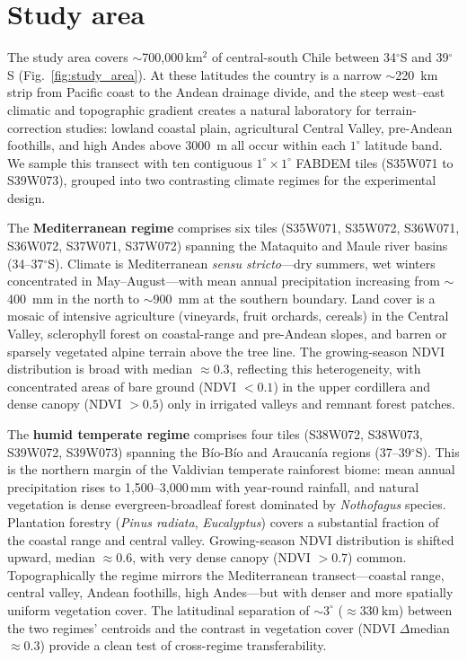 \documentclass[preprint,authoryear,number]{elsarticle}
\begin{document}
\section{Study area}
\label{sec:study_area}

The study area covers $\sim$700{,}000\,km$^{2}$ of central-south Chile between 34$^{\circ}$S and 39$^{\circ}$S (Fig.~\ref{fig:study_area}). At these latitudes the country is a narrow $\sim$\SI{220}{\kilo\meter} strip from Pacific coast to the Andean drainage divide, and the steep west--east climatic and topographic gradient creates a natural laboratory for terrain-correction studies: lowland coastal plain, agricultural Central Valley, pre-Andean foothills, and high Andes above \SI{3000}{\meter} all occur within each $1^{\circ}$ latitude band. We sample this transect with ten contiguous $1^{\circ} \times 1^{\circ}$ FABDEM tiles (S35W071 to S39W073), grouped into two contrasting climate regimes for the experimental design.

The \textbf{Mediterranean regime} comprises six tiles (S35W071, S35W072, S36W071, S36W072, S37W071, S37W072) spanning the Mataquito and Maule river basins (34--37$^{\circ}$S). Climate is Mediterranean \emph{sensu stricto}---dry summers, wet winters concentrated in May--August---with mean annual precipitation increasing from $\sim$\SI{400}{\milli\meter} in the north to $\sim$\SI{900}{\milli\meter} at the southern boundary. Land cover is a mosaic of intensive agriculture (vineyards, fruit orchards, cereals) in the Central Valley, sclerophyll forest on coastal-range and pre-Andean slopes, and barren or sparsely vegetated alpine terrain above the tree line. The growing-season NDVI distribution is broad with median $\approx 0.3$, reflecting this heterogeneity, with concentrated areas of bare ground (NDVI $< 0.1$) in the upper cordillera and dense canopy (NDVI $> 0.5$) only in irrigated valleys and remnant forest patches.

The \textbf{humid temperate regime} comprises four tiles (S38W072, S38W073, S39W072, S39W073) spanning the B\'io-B\'io and Araucan\'ia regions (37--39$^{\circ}$S). This is the northern margin of the Valdivian temperate rainforest biome: mean annual precipitation rises to 1{,}500--3{,}000\,mm with year-round rainfall, and natural vegetation is dense evergreen-broadleaf forest dominated by \emph{Nothofagus} species. Plantation forestry (\emph{Pinus radiata}, \emph{Eucalyptus}) covers a substantial fraction of the coastal range and central valley. Growing-season NDVI distribution is shifted upward, median $\approx 0.6$, with very dense canopy (NDVI $> 0.7$) common. Topographically the regime mirrors the Mediterranean transect---coastal range, central valley, Andean foothills, high Andes---but with denser and more spatially uniform vegetation cover. The latitudinal separation of $\sim 3^{\circ}$ ($\approx \SI{330}{\kilo\meter}$) between the two regimes' centroids and the contrast in vegetation cover (NDVI $\Delta$median $\approx 0.3$) provide a clean test of cross-regime transferability.
\end{document}
